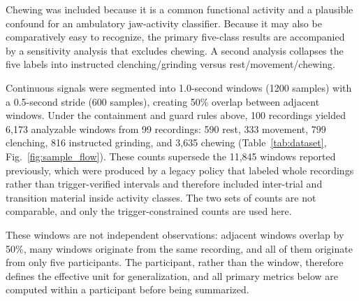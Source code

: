 \documentclass[pdflatex,sn-nature,iicol]{sn-jnl}
\begin{document}
Chewing was included because it is a common functional activity and a plausible confound for an ambulatory jaw-activity classifier. Because it may also be comparatively easy to recognize, the primary five-class results are accompanied by a sensitivity analysis that excludes chewing. A second analysis collapses the five labels into instructed clenching/grinding versus rest/movement/chewing.

Continuous signals were segmented into 1.0-second windows (1200 samples) with a 0.5-second stride (600 samples), creating 50\% overlap between adjacent windows. Under the containment and guard rules above, 100 recordings yielded 6,173 analyzable windows from 99 recordings: 590 rest, 333 movement, 799 clenching, 816 instructed grinding, and 3,635 chewing (Table~\ref{tab:dataset}, Fig.~\ref{fig:sample_flow}). These counts supersede the 11,845 windows reported previously, which were produced by a legacy policy that labeled whole recordings rather than trigger-verified intervals and therefore included inter-trial and transition material inside activity classes. The two sets of counts are not comparable, and only the trigger-constrained counts are used here.

These windows are not independent observations: adjacent windows overlap by 50\%, many windows originate from the same recording, and all of them originate from only five participants. The participant, rather than the window, therefore defines the effective unit for generalization, and all primary metrics below are computed within a participant before being summarized.
\end{document}
